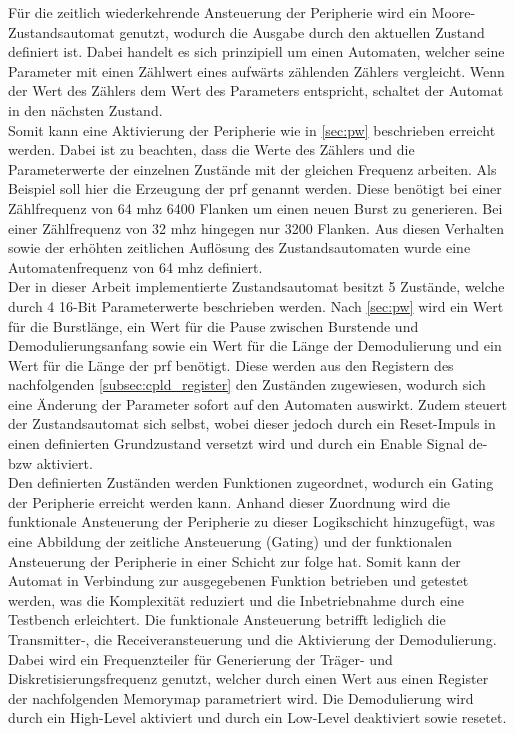 Für die zeitlich wiederkehrende Ansteuerung der Peripherie wird ein Moore-Zustandsautomat genutzt, wodurch die Ausgabe durch den aktuellen Zustand definiert ist. Dabei handelt es sich prinzipiell um einen Automaten, welcher seine Parameter mit einen Zählwert eines aufwärts zählenden Zählers vergleicht. Wenn der Wert des Zählers dem Wert des Parameters entspricht, schaltet der Automat in den nächsten Zustand.\\
Somit kann eine Aktivierung der Peripherie wie in \autoref{sec:pw} beschrieben erreicht werden. Dabei ist zu beachten, dass die Werte des Zählers und die Parameterwerte der einzelnen Zustände mit der gleichen Frequenz arbeiten.
Als Beispiel soll hier die Erzeugung der \ac{prf} genannt werden. Diese benötigt bei einer Zählfrequenz von 64 \ac{mhz} 6400 Flanken um einen neuen Burst zu generieren. Bei einer Zählfrequenz von 32 \ac{mhz} hingegen nur 3200 Flanken. Aus diesen Verhalten sowie der erhöhten zeitlichen Auflösung des Zustandsautomaten wurde eine Automatenfrequenz von 64 \ac{mhz} definiert.\\
Der in dieser Arbeit implementierte Zustandsautomat besitzt 5 Zustände, welche durch 4 16-Bit Parameterwerte beschrieben werden. Nach \autoref{sec:pw} wird ein Wert für die Burstlänge, ein Wert für die Pause zwischen Burstende und Demodulierungsanfang sowie ein Wert für die Länge der Demodulierung und ein Wert für die Länge der \ac{prf} benötigt. Diese werden aus den Registern des nachfolgenden \autoref{subsec:cpld_register} den Zuständen zugewiesen, wodurch sich eine Änderung der Parameter sofort auf den Automaten auswirkt. Zudem steuert der Zustandsautomat sich selbst, wobei dieser jedoch durch ein Reset-Impuls in einen definierten Grundzustand versetzt wird und durch ein Enable Signal de- \ac{bzw} aktiviert.\\
Den definierten Zuständen werden Funktionen zugeordnet, wodurch ein Gating der Peripherie erreicht werden kann. Anhand dieser Zuordnung wird die funktionale Ansteuerung der Peripherie zu dieser Logikschicht hinzugefügt, was eine Abbildung der zeitliche Ansteuerung (Gating) und der funktionalen Ansteuerung der Peripherie in einer Schicht zur folge hat. Somit kann der Automat in Verbindung zur ausgegebenen Funktion betrieben und getestet werden, was die Komplexität reduziert und die Inbetriebnahme durch eine Testbench erleichtert.
Die funktionale Ansteuerung betrifft lediglich die Transmitter-, die Receiveransteuerung und die Aktivierung der Demodulierung. Dabei wird ein Frequenzteiler für Generierung der Träger- und Diskretisierungsfrequenz genutzt, welcher durch einen Wert aus einen Register der nachfolgenden Memorymap parametriert wird. Die Demodulierung wird durch ein High-Level aktiviert und durch ein Low-Level deaktiviert sowie resetet.
